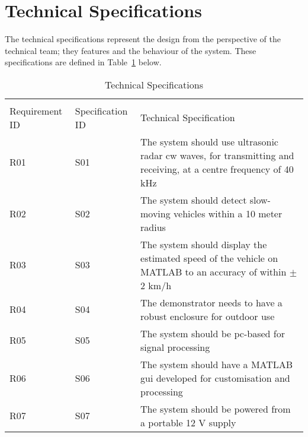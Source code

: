 \documentclass[class=report,11pt,crop=false]{standalone}
\begin{document}
\section{Technical Specifications}
The technical specifications represent the design from the perspective of the technical team; they features and the behaviour of the system. These specifications are defined in Table~\ref{tab:Table 2} below.\\
\begin{table}[htbp]
\centering
\caption{\label{tab:Table 2} Technical Specifications}
\vspace{-0.5cm}
\begin{tabular}{|m{7em}|m{7em}|m{10cm}|}
\multicolumn{3}{l}{}\\
\cline{1-3}
Requirement ID  & Specification ID & Technical Specification\\ \cline{1-3}
R01   & S01 & The system should use ultrasonic radar \gls{cw} waves, for transmitting and receiving, at a centre frequency of 40 kHz \\ \cline{1-3}
R02   & S02 & The system should detect slow-moving vehicles within a 10 meter radius\\ \cline{1-3}
R03   & S03 & The system should display the estimated speed of the vehicle on \textsc{MATLAB} to an accuracy of within $\pm$2 km/h \\\cline{1-3}
R04   & S04 & The demonstrator needs to have a robust enclosure for outdoor use \\ \cline{1-3}
R05   & S05 & The system should be \gls{pc}-based for signal processing\\ \cline{1-3}
R06   & S06 & The system should have a \textsc{MATLAB} \gls{gui} developed for customisation and processing \\ \cline{1-3}
R07   & S07 & The system should be powered from a portable 12 V supply \\ \cline{1-3}
\end{tabular}
\end{table}
\end{document}
